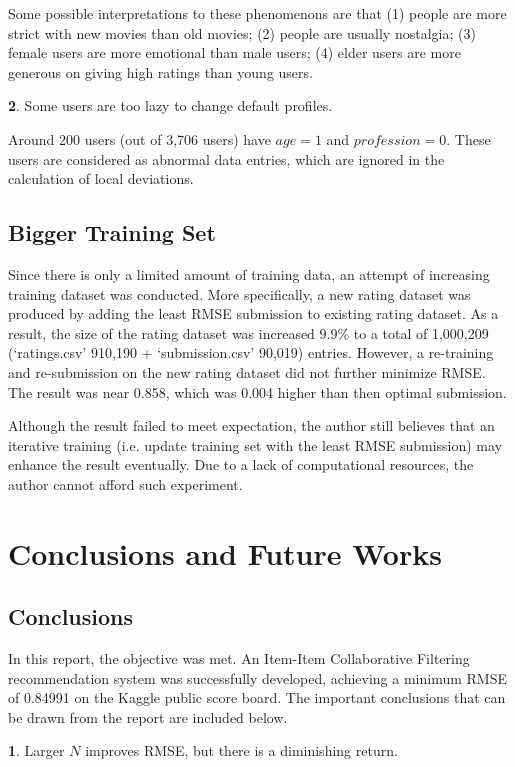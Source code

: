 \documentclass{ece}
\begin{document}
Some possible interpretations to these phenomenons are that (1) people are more strict with new movies than old movies;
(2) people are usually nostalgia; (3) female users are more emotional than male users; (4) elder users are more generous on giving high ratings than young users.

\textbf{2}. Some users are too lazy to change default profiles.

Around 200 users (out of 3,706 users) have $age=1$ and $profession=0$.
These users are considered as abnormal data entries, which are ignored in the calculation of local deviations.

\subsection{Bigger Training Set}

Since there is only a limited amount of training data, an attempt of increasing training dataset was conducted.
More specifically, a new rating dataset was produced by adding the least RMSE submission to existing rating dataset.
As a result, the size of the rating dataset was increased 9.9\% to a total of 1,000,209 (`ratings.csv' 910,190 + `submission.csv' 90,019) entries.
However, a re-training and re-submission on the new rating dataset did not further minimize RMSE. The result was near 0.858, which was 0.004 higher than then optimal submission.

Although the result failed to meet expectation, the author still believes that an iterative training (i.e. update training set with the least RMSE submission) may enhance the result eventually.
Due to a lack of computational resources, the author cannot afford such experiment.

\newpage
\section{Conclusions and Future Works}

\subsection{Conclusions}

In this report, the objective was met.
An Item-Item Collaborative Filtering recommendation system was successfully developed, achieving a minimum RMSE of 0.84991 on the Kaggle public score board.
The important conclusions that can be drawn from the report are included below.

\textbf{1}. Larger $N$ improves RMSE, but there is a diminishing return.
\end{document}
